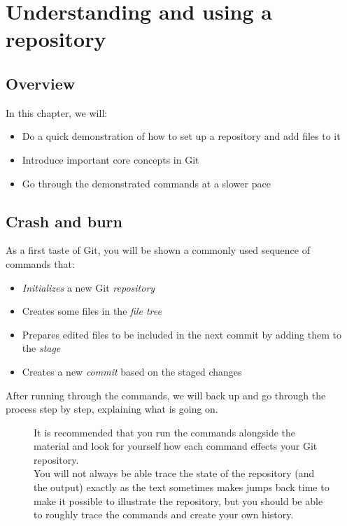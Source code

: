\documentclass[../main/git_course_main.tex]{subfiles}
\begin{document}

\setcounter{chapter}{1}
\chapter{Understanding and using a repository}

\section{Overview}

In this chapter, we will:

\begin{itemize}
	\item Do a quick demonstration of how to set up a repository and add files to it
	\item Introduce important core concepts in Git
	\item Go through the demonstrated commands at a slower pace
\end{itemize}

\section{Crash and burn}

As a first taste of Git, you will be shown a commonly used sequence of commands that:

\begin{itemize}
	\item \textit{Initializes} a new Git \textit{repository}
	\item Creates some files in the \textit{file tree}
	\item Prepares edited files to be included in the next commit by adding them to the \textit{stage}
	\item Creates a new \textit{commit} based on the staged changes
\end{itemize}

After running through the commands, we will back up and go through the process step by step, explaining what is going on.

\begin{figure}[h!]
\begin{redbox}
It is recommended that you run the commands alongside the material and look for yourself how each command effects your Git repository. \\

You will not always be able trace the state of the repository (and the output) exactly as the text sometimes makes jumps back time to make it possible to illustrate the repository, but you should be able to roughly trace the commands and create your own history.
\end{redbox}
\end{figure}
\end{document}
